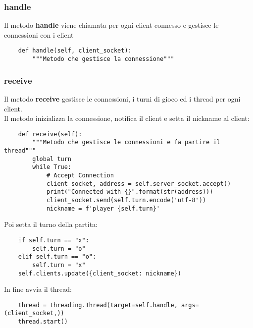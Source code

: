 \documentclass{article}
\begin{document}
\subsubsection{handle}
Il metodo \textbf{handle} viene chiamata per ogni client connesso e gestisce le connessioni 
con i client

\begin{verbatim}
    def handle(self, client_socket):
        """Metodo che gestisce la connessione"""
\end{verbatim}

\subsubsection{receive}
Il metodo \textbf{receive} gestisce le connessioni, i turni di gioco ed i thread per ogni client.\\

Il metodo inizializza la connessione, notifica il client e setta il nickname al client:

\begin{verbatim}
    def receive(self):
        """Metodo che gestisce le connessioni e fa partire il thread"""
        global turn
        while True:
            # Accept Connection
            client_socket, address = self.server_socket.accept()
            print("Connected with {}".format(str(address)))
            client_socket.send(self.turn.encode('utf-8'))
            nickname = f'player {self.turn}'
\end{verbatim}

Poi setta il turno della partita:

\begin{verbatim}
    if self.turn == "x":
        self.turn = "o"
    elif self.turn == "o":
        self.turn = "x"
    self.clients.update({client_socket: nickname})
\end{verbatim}

In fine avvia il thread:

\begin{verbatim}
    thread = threading.Thread(target=self.handle, args=(client_socket,))
    thread.start()
\end{verbatim}
\end{document}
